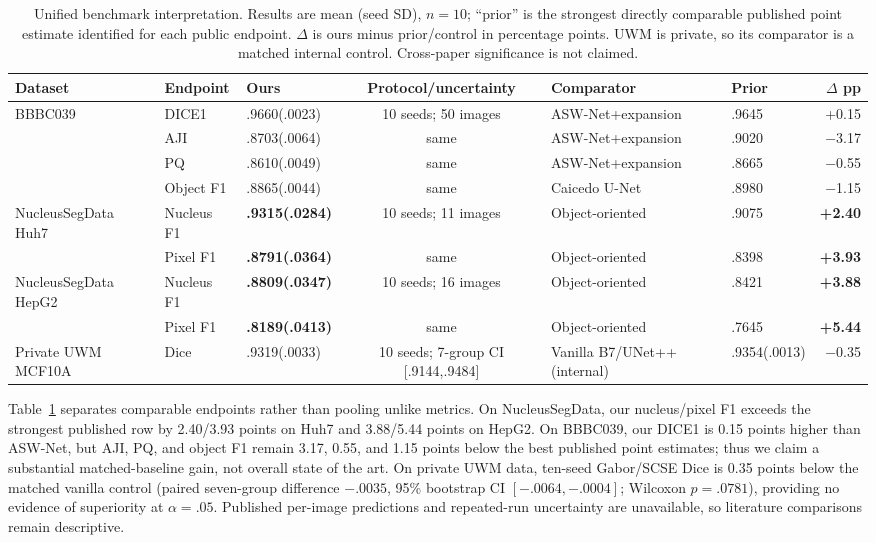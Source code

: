 \documentclass{article}
\begin{document}
\begin{table}[t]
\centering\scriptsize
\caption{Unified benchmark interpretation. Results are mean (seed SD), $n=10$; ``prior'' is the strongest directly comparable published point estimate identified for each public endpoint. $\Delta$ is ours minus prior/control in percentage points. UWM is private, so its comparator is a matched internal control. Cross-paper significance is not claimed.}
\label{tab:crossdataset}
\setlength{\tabcolsep}{3.8pt}
\begin{tabular}{@{}lllcllr@{}}\toprule
Dataset & Endpoint & Ours & Protocol/uncertainty & Comparator & Prior & $\Delta$ pp\\\midrule
BBBC039 & DICE1 & .9660(.0023) & 10 seeds; 50 images & ASW-Net+expansion~\cite{wang2022aswnet} & .9645 & +0.15\\
& AJI & .8703(.0064) & same & ASW-Net+expansion~\cite{wang2022aswnet} & .9020 & $-$3.17\\
& PQ & .8610(.0049) & same & ASW-Net+expansion~\cite{wang2022aswnet} & .8665 & $-$0.55\\
& Object F1 & .8865(.0044) & same & Caicedo U-Net~\cite{caicedo2019evaluation} & .8980 & $-$1.15\\\midrule
NucleusSegData Huh7 & Nucleus F1 & \textbf{.9315(.0284)} & 10 seeds; 11 images & Object-oriented~\cite{koyuncu2018object} & .9075 & \textbf{+2.40}\\
& Pixel F1 & \textbf{.8791(.0364)} & same & Object-oriented~\cite{koyuncu2018object} & .8398 & \textbf{+3.93}\\
NucleusSegData HepG2 & Nucleus F1 & \textbf{.8809(.0347)} & 10 seeds; 16 images & Object-oriented~\cite{koyuncu2018object} & .8421 & \textbf{+3.88}\\
& Pixel F1 & \textbf{.8189(.0413)} & same & Object-oriented~\cite{koyuncu2018object} & .7645 & \textbf{+5.44}\\\midrule
Private UWM MCF10A & Dice & .9319(.0033) & 10 seeds; 7-group CI [.9144,.9484] & Vanilla B7/UNet++ (internal) & .9354(.0013) & $-$0.35\\\bottomrule
\end{tabular}
\end{table}

Table~\ref{tab:crossdataset} separates comparable endpoints rather than pooling unlike metrics. On NucleusSegData, our nucleus/pixel F1 exceeds the strongest published row by 2.40/3.93 points on Huh7 and 3.88/5.44 points on HepG2. On BBBC039, our DICE1 is 0.15 points higher than ASW-Net, but AJI, PQ, and object F1 remain 3.17, 0.55, and 1.15 points below the best published point estimates; thus we claim a substantial matched-baseline gain, not overall state of the art. On private UWM data, ten-seed Gabor/SCSE Dice is 0.35 points below the matched vanilla control (paired seven-group difference $-.0035$, 95\% bootstrap CI $[-.0064,-.0004]$; Wilcoxon $p=.0781$), providing no evidence of superiority at $\alpha=.05$. Published per-image predictions and repeated-run uncertainty are unavailable, so literature comparisons remain descriptive.
\end{document}
